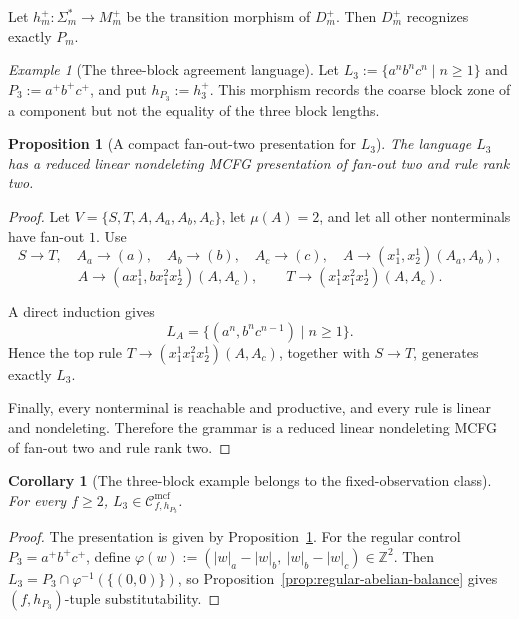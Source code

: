 \documentclass[11pt,a4paper]{article}
\numberwithin{equation}{section}
\theoremstyle{plain}
\newtheorem{proposition}[theorem]{Proposition}
\newtheorem{corollary}[theorem]{Corollary}
\theoremstyle{definition}
\theoremstyle{remark}
\newtheorem{example}[theorem]{Example}
\newcommand{\Cmcf}[2]{\mathcal{C}^{\mathrm{mcf}}_{#1,#2}}
\begin{document}
Let
\(h_m^+:\Sigma_m^*\to M_m^+\)
be the transition morphism of \(D_m^+\).
Then \(D_m^+\) recognizes exactly \(P_m\).


\begin{example}[The three-block agreement language]
\label{ex:l3-language}
Let
\(L_3:=\{a^n b^n c^n\mid n\ge1\}\) and
\(P_3:=a^+b^+c^+\), and put \(h_{P_3}:=h_3^+\).
This morphism records the coarse block zone of a component but not the equality
of the three block lengths.
\end{example}

\begin{proposition}[A compact fan-out-two presentation for \(L_3\)]
\label{prop:l3-running-example}
The language \(L_3\) has a reduced linear nondeleting MCFG presentation of
fan-out two and rule rank two.
\end{proposition}

\begin{proof}
Let \(V=\{S,T,A,A_a,A_b,A_c\}\), let \(\mu(A)=2\), and let all other
nonterminals have fan-out \(1\).
Use
\[
  S\to T,\quad
  A_a\to(a),\quad
  A_b\to(b),\quad
  A_c\to(c),\quad
  A\to(x_1^1,x_2^1)(A_a,A_b),
\]
\[
  A\to(ax_1^1,bx_1^2x_2^1)(A,A_c),\qquad
  T\to(x_1^1x_1^2x_2^1)(A,A_c).
\]

A direct induction gives
\[
  L_A=\{(a^n,b^nc^{n-1})\mid n\ge1\}.
\]
Hence the top rule
\(T\to(x_1^1x_1^2x_2^1)(A,A_c)\),
together with \(S\to T\), generates exactly \(L_3\).

Finally, every nonterminal is reachable and productive, and every rule is
linear and nondeleting.
Therefore the grammar is a reduced linear nondeleting MCFG of fan-out two and rule rank two.
\end{proof}

\begin{corollary}[The three-block example belongs to the fixed-observation class]
\label{cor:l3-in-fixed-observation-class}
For every \(f\ge2\), \(L_3\in\Cmcf{f}{h_{P_3}}\).
\end{corollary}

\begin{proof}
The presentation is given by Proposition~\ref{prop:l3-running-example}.
For the regular control \(P_3=a^+b^+c^+\), define
\(\varphi(w):=(|w|_a-|w|_b,\ |w|_b-|w|_c)\in\mathbb Z^2\).
Then \(L_3=P_3\cap\varphi^{-1}(\{(0,0)\})\), so
Proposition~\ref{prop:regular-abelian-balance} gives
\((f,h_{P_3})\)-tuple substitutability.
\end{proof}
\end{document}
